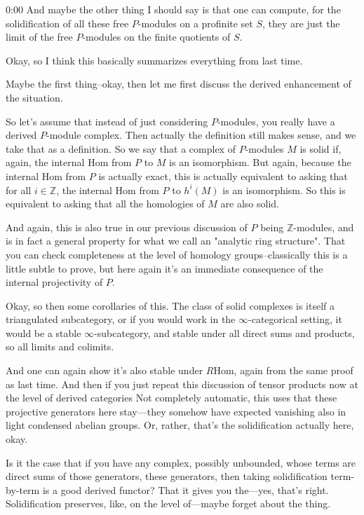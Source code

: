 \begin{unfinished}{0:00}
And maybe the other thing I should say is that one can compute, for the solidification of all these free $P$-modules on a profinite set $S$, they are just the limit of the free $P$-modules on the finite quotients of $S$.

Okay, so I think this basically summarizes everything from last time.

Maybe the first thing--okay, then let me first discuss the derived enhancement of the situation.

So let's assume that instead of just considering $P$-modules, you really have a derived $P$-module complex. Then actually the definition still makes sense, and we take that as a definition. So we say that a complex of $P$-modules $M$ is solid if, again, the internal $\mathrm{Hom}$ from $P$ to $M$ is an isomorphism. But again, because the internal $\mathrm{Hom}$ from $P$ is actually exact, this is actually equivalent to asking that for all $i \in \mathbb{Z}$, the internal $\mathrm{Hom}$ from $P$ to $h^i(M)$ is an isomorphism. So this is equivalent to asking that all the homologies of $M$ are also solid.

And again, this is also true in our previous discussion of $P$ being $\mathbb{Z}$-modules, and is in fact a general property for what we call an "analytic ring structure". That you can check completeness at the level of homology groups--classically this is a little subtle to prove, but here again it's an immediate consequence of the internal projectivity of $P$.

Okay, so then some corollaries of this. The class of solid complexes is itself a triangulated subcategory, or if you would work in the $\infty$-categorical setting, it would be a stable $\infty$-subcategory, and stable under all direct sums and products, so all limits and colimits.

And one can again show it's also stable under $R\mathrm{Hom}$, again from the same proof as last time. And then if you just repeat this discussion of tensor products now at the level of derived categories
Not completely automatic, this uses that these projective generators here stay---they somehow have expected vanishing also in light condensed abelian groups. Or, rather, that's the solidification actually here, okay.

Is it the case that if you have any complex, possibly unbounded, whose terms are direct sums of those generators, these generators, then taking solidification term-by-term is a good derived functor? That it gives you the---yes, that's right. Solidification preserves, like, on the level of---maybe forget about the thing.


\end{unfinished}
